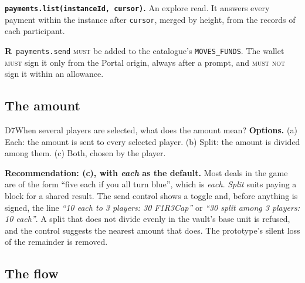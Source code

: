 \documentclass[11pt,a4paper]{article}
\newcommand{\code}[1]{\texttt{#1}}
\newcommand{\MUST}{\textsc{must}}
\newcommand{\MUSTNOT}{\textsc{must not}}
\newcounter{req}
\newcommand{\req}[1]{\refstepcounter{req}\label{#1}\textbf{R\thereq}}
\begin{document}
\textbf{\code{payments.list(instanceId, cursor)}.} An explore read. It answers every payment
within the instance after \code{cursor}, merged by height, from the records of each
participant.

\req{r:moves-funds}~\code{payments.send} \MUST{} be added to the catalogue's
\code{MOVES\_FUNDS}. The wallet \MUST{} sign it only from the Portal origin, always after a
prompt, and \MUSTNOT{} sign it within an allowance.

\subsection{The amount}

\begin{decision}{D7}{When several players are selected, what does the amount mean?}
\textbf{Options.} (a) Each: the amount is sent to every selected player. (b) Split: the amount
is divided among them. (c) Both, chosen by the player.

\textbf{Recommendation: (c), with \emph{each} as the default.} Most deals in the game are of the
form ``five each if you all turn blue'', which is \emph{each}. \emph{Split} suits paying a block
for a shared result. The send control shows a toggle and, before anything is signed, the line
\emph{``10 each to 3 players: 30 F1R3Cap''} or \emph{``30 split among 3 players: 10 each''}. A
split that does not divide evenly in the vault's base unit is refused, and the control
suggests the nearest amount that does. The prototype's silent loss of the remainder is
removed.
\end{decision}

\subsection{The flow}
\end{document}
